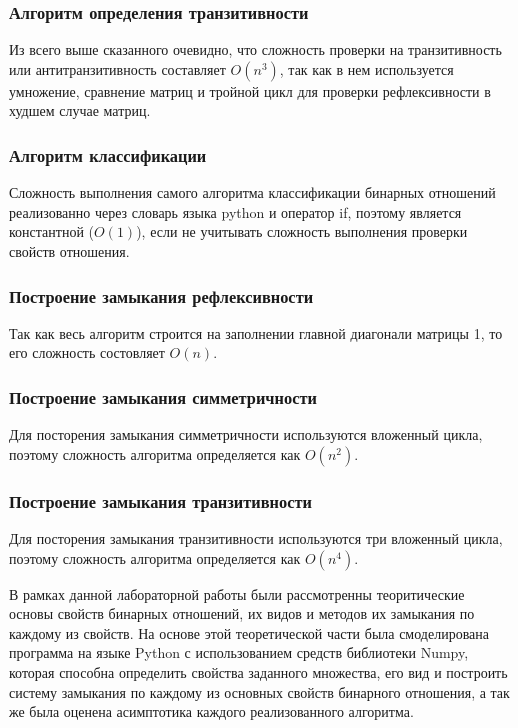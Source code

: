 \documentclass[spec, och, labwork]{shiza}
\begin{document}
        \subsubsection{Алгоритм определения транзитивности}

            Из всего выше сказанного очевидно, что сложность проверки на транзитивность или антитранзитивность составляет $O(n^3)$,
            так как в нем используется умножение, сравнение матриц и тройной цикл для проверки рефлексивности в худшем случае матриц.

        \subsubsection{Алгоритм классификации}
            Сложность выполнения самого алгоритма классификации бинарных отношений реализованно через словарь языка python
            и оператор if, поэтому является константной ($O(1)$), если не учитывать сложность выполнения проверки свойств отношения.

        \subsubsection{Построение замыкания рефлексивности}
        
            Так как весь алгоритм строится на заполнении главной диагонали матрицы 1, то его сложность состовляет $O(n)$.

        \subsubsection{Построение замыкания симметричности}

            Для посторения замыкания симметричности используются вложенный цикла, поэтому сложность алгоритма
            определяется как $O(n^2)$.

        \subsubsection{Построение замыкания транзитивности}

            Для посторения замыкания транзитивности используются три вложенный цикла, поэтому сложность алгоритма
            определяется как $O(n^4)$.
    
\conclusion

В рамках данной лабораторной работы были рассмотренны теоритические основы свойств бинарных отношений, их видов и методов
их замыкания по каждому из свойств. На основе этой теоретической части была смоделирована программа на языке Python с 
использованием средств библиотеки Numpy, которая способна определить свойства заданного множества, его вид и построить 
систему замыкания по каждому из основных свойств бинарного отношения, а так же была оценена асимптотика каждого реализованного
алгоритма.
\end{document}
